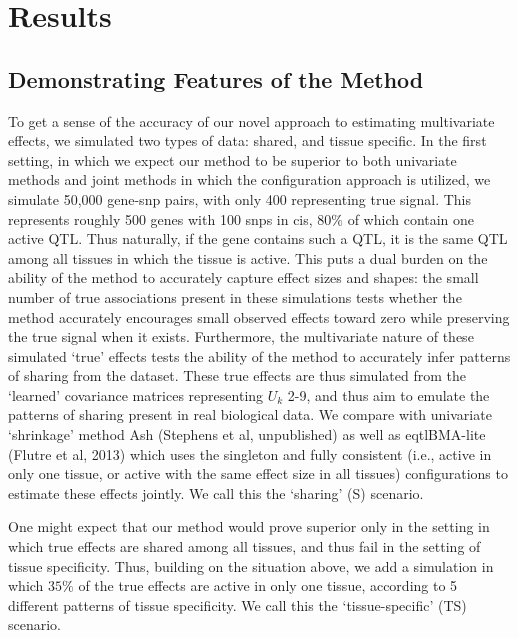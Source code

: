 
\section{Results}
\subsection{Demonstrating Features of the Method}

To get a sense of the accuracy of our novel approach to estimating multivariate effects, we simulated two types of data: shared, and tissue specific. In the first setting, in which we expect our method to be superior to both univariate methods and joint methods in which the configuration approach is utilized, we simulate 50,000 gene-snp pairs, with only 400 representing true signal. This represents roughly 500 genes with 100 snps in cis, $80\%$ of which contain one active QTL. Thus naturally, if the gene contains such a QTL, it is the same QTL among all tissues in which the tissue is active. This puts a dual burden on the ability of the method to accurately capture effect sizes and shapes: the small number of true associations present in these simulations tests whether the method accurately encourages small observed effects toward zero while preserving the true signal when it exists. Furthermore, the  multivariate nature of these simulated `true' effects tests the ability of the method to accurately infer patterns of sharing from the dataset. These true effects are thus simulated from the `learned' covariance matrices representing $U_{k}$ 2-9, and thus aim to emulate the patterns of sharing present in real biological data. We compare with univariate `shrinkage' method Ash (Stephens et al, unpublished) as well as eqtlBMA-lite (Flutre et al, 2013) which uses the singleton and fully consistent (i.e., active in only one tissue, or active with the same effect size in all tissues) configurations to estimate these effects jointly. We call this the `sharing' (S) scenario. 

One might expect that our method would prove superior only in the setting in which true effects are shared among all tissues, and thus fail in the setting of tissue specificity. Thus, building on the situation above, we add a simulation in which $35\%$ of the true effects are active in only one tissue, according to 5 different patterns of tissue specificity. We call this the `tissue-specific' (TS) scenario. 

